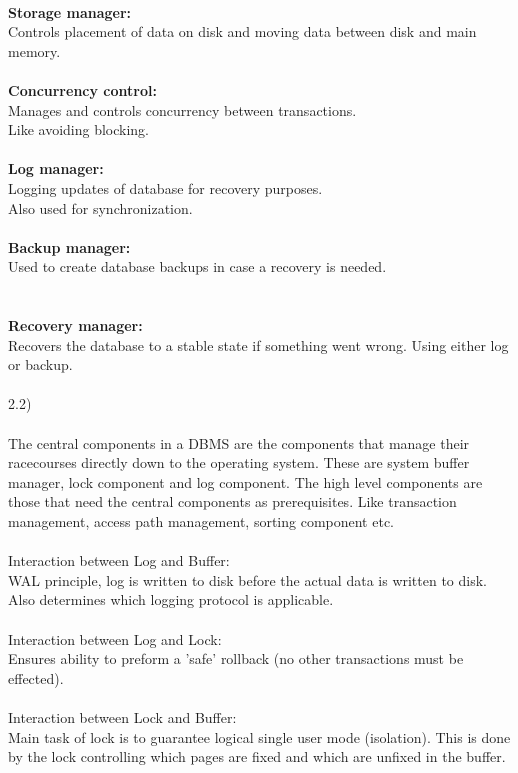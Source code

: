 \documentclass[12pt, letterpaper, twoside]{article}
\begin{document}
\\
\textbf{Storage manager:}\\
Controls placement of data on disk and moving data between disk and main memory.\\
\\
\textbf{Concurrency control:}\\
Manages and controls concurrency between transactions.\\ Like avoiding blocking.\\
\\
\textbf{Log manager:}\\
Logging updates of database for recovery purposes.\\ Also used for synchronization.\\
\\  
\textbf{Backup manager:}\\
Used to create database backups in case a recovery is needed.\\
\\
\newpage
\ \\
\textbf{Recovery manager:}\\
Recovers the database to a stable state if something went wrong. Using either log or backup.\\
\\
2.2)\\
\\
The central components in a DBMS are the components that manage their racecourses directly down to the operating system. These are system buffer manager, lock component and log component. The high level components are those that need the central components as prerequisites. Like transaction management, access path management, sorting component etc.\\  
\\
Interaction between Log and Buffer:\\
WAL principle, log is written to disk before the actual data is written to disk. Also determines which logging protocol is applicable.\\
\\
Interaction between Log and Lock:\\
Ensures ability to preform a 'safe' rollback (no other transactions must be effected).\\
\\
Interaction between Lock and Buffer:\\
Main task of lock is to guarantee logical single user mode (isolation). This is done by the lock controlling which pages are fixed and which are unfixed in the buffer.\\
\end{document}
